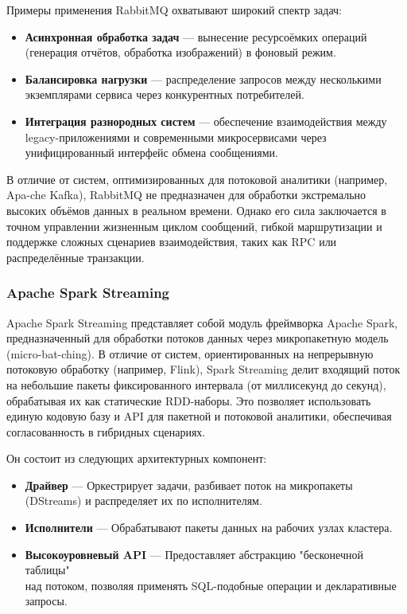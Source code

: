             Примеры применения RabbitMQ охватывают широкий спектр задач:
            \begin{itemize}
                \item \textbf{Асинхронная обработка задач} — вынесение ресурсоёмких операций (генерация отчётов, обработка изображений) в фоновый режим.
                \item \textbf{Балансировка нагрузки} — распределение запросов между несколькими экземплярами сервиса через конкурентных потребителей.
                \item \textbf{Интеграция разнородных систем} — обеспечение взаимодействия между legacy-приложениями и современными микросервисами через унифицированный интерфейс обмена сообщениями.
            \end{itemize}
            
            В отличие от систем, оптимизированных для потоковой аналитики (например, Apa-che Kafka), RabbitMQ не предназначен для обработки экстремально высоких объёмов данных в реальном времени. Однако его сила заключается в точном управлении жизненным циклом сообщений, гибкой маршрутизации и поддержке сложных сценариев взаимодействия, таких как RPC или распределённые транзакции.

        \subsubsection{Apache Spark Streaming}
            Apache Spark Streaming представляет собой модуль фреймворка Apache Spark, предназначенный для обработки потоков данных через микропакетную модель (micro-bat-ching). В отличие от систем, ориентированных на непрерывную потоковую обработку (например, Flink), Spark Streaming делит входящий поток на небольшие пакеты фиксированного интервала (от миллисекунд до секунд), обрабатывая их как статические RDD-наборы. Это позволяет использовать единую кодовую базу и API для пакетной и потоковой аналитики, обеспечивая согласованность в гибридных сценариях.
            
            
            Он состоит из следующих архитектурных компонент:
            \begin{itemize}
                \item \textbf{Драйвер} — Оркестрирует задачи, разбивает поток на микропакеты (DStreams) и распределяет их по исполнителям.
                \item \textbf{Исполнители} — Обрабатывают пакеты данных на рабочих узлах кластера.
                \item \textbf{Высокоуровневый API} — Предоставляет абстракцию "бесконечной таблицы"\\ над потоком, позволяя применять SQL-подобные операции и декларативные запросы.
            \end{itemize}
            

